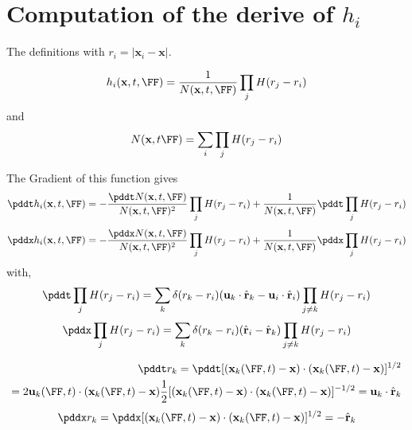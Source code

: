 \section{Computation of the derive of $h_i$}
\label{ap:computationof_h}

The definitions with $r_i = |\textbf{x}_i - \textbf{x}|$.  

\begin{equation*}
    h_i(\textbf{x},t,\FF)
    = 
    \frac{1}{N(\textbf{x},t,\FF)}
    \prod_j
    H(r_j - r_i)
\end{equation*}
and 
\begin{equation*}
    N(\textbf{x},t\FF)
    = \sum_i \prod_j 
    H(r_j - r_i)
\end{equation*}

The Gradient of this function gives
\begin{equation*}
    \pddt  h_i(\textbf{x},t,\FF)
    = 
    -  \frac{\pddt N(\textbf{x},t,\FF)}{N(\textbf{x},t,\FF)^2}
    \prod_j
    H(r_j - r_i)
    + \frac{1}{N(\textbf{x},t,\FF)}
    \pddt \prod_j
    H(r_j - r_i)
\end{equation*}
\begin{equation*}
    \pddx  h_i(\textbf{x},t,\FF)
    = 
    -  \frac{\pddx N(\textbf{x},t,\FF)}{N(\textbf{x},t,\FF)^2}
    \prod_j
    H(r_j - r_i)
    + \frac{1}{N(\textbf{x},t,\FF)}
    \pddx \prod_j
    H(r_j - r_i)
\end{equation*}
with, 
\begin{equation*}
    \pddt 
    \prod_j
    H(r_j - r_i)
    = 
    \sum_k 
    \delta(r_k - r_i)
    (\textbf{u}_k  \cdot \hat{\textbf{r}}_k - \textbf{u}_i  \cdot \hat{\textbf{r}}_i)
    \prod_{j\neq k}
    H(r_j - r_i)
\end{equation*}
\begin{equation*}
    \pddx
    \prod_j
    H(r_j - r_i)
    = 
    \sum_k 
    \delta(r_k - r_i)
    ( \hat{\textbf{r}}_i -  \hat{\textbf{r}}_k)
    \prod_{j\neq k}
    H(r_j - r_i)
\end{equation*}

\begin{align*}
    \pddt r_k
    = \pddt [(\textbf{x}_k(\FF,t) - \textbf{x})\cdot (\textbf{x}_k(\FF,t) - \textbf{x})]^{1/2}\\
    = 
    2 \textbf{u}_k(\FF,t)  \cdot (\textbf{x}_k(\FF,t) - \textbf{x})
    \frac{1}{2}[(\textbf{x}_k(\FF,t) - \textbf{x})\cdot (\textbf{x}_k(\FF,t) - \textbf{x})]^{- 1/2}
    = 
    \textbf{u}_k  \cdot \hat{\textbf{r}}_k
\end{align*}
\begin{align*}
    \pddx r_k
    = \pddx [(\textbf{x}_k(\FF,t) - \textbf{x})\cdot (\textbf{x}_k(\FF,t) - \textbf{x})]^{1/2}
    = - \hat{\textbf{r}}_k
\end{align*}

